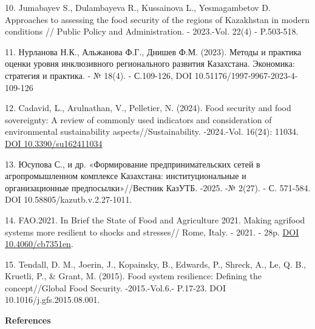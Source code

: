 \begin{refs}
10. Jumabayev S., Dulambayeva R., Kussainova L., Yesmagambetov D.
Approaches to assessing the food security of the regions of Kazakhstan
in modern conditions // Public Policy and Administration. - 2023.-Vol.
22(4) - P.503-518.

11. Нурланова Н.К., Альжанова Ф.Г., Днишев Ф.М. (2023). Методы и
практика оценки уровня инклюзивного регионального развития Казахстана.
Экономика: стратегия и практика. - № 18(4). - С.109-126, DOI
10.51176/1997-9967-2023-4-109-126

12. Cadavid, L., Arulnathan, V., Pelletier, N. (2024). Food security and
food sovereignty: A review of commonly used indicators and consideration
of environmental sustainability aspects//Sustainability. -2024.-Vol.
16(24): 11034. \href{https://doi.org/10.3390/su162411034}{DOI
10.3390/su162411034}

13. Юсупова С., и др. «Формирование предпринимательских сетей в
агропромышленном комплексе Казахстана: институциональные и
организационные предпосылки»//Вестник КазУТБ. -2025. -№ 2(27). - С.
571-584. DOI 10.58805/kazutb.v.2.27-1011.

14. FAO.2021. In Brief the State of Food and Agriculture 2021. Making
agrifood systems more resilient to shocks and stresses// Rome, Italy. -
2021. - 28p. \href{https://doi.org/10.4060/cb7351en}{DOI
10.4060/cb7351en}.

15. Tendall, D. M., Joerin, J., Kopainsky, B., Edwards, P., Shreck, A.,
Le, Q. B., Kruetli, P., \& Grant, M. (2015). Food system resilience:
Defining the concept//Global Food Security. -2015.-Vol.6.- P.17-23. DOI
10.1016/j.gfs.2015.08.001.
\end{refs}

\begin{center}
{\bfseries References}
\end{center}

